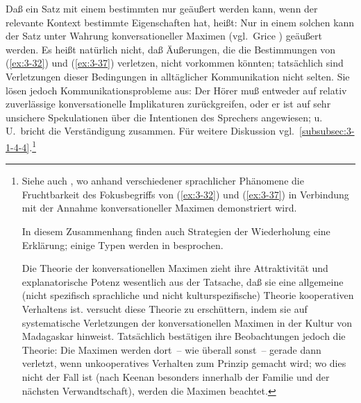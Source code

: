 \documentclass[output=paper]{langsci/langscibook}
\begin{document}
Daß ein Satz mit einem bestimmten  nur geäußert werden kann, wenn
der relevante Kontext bestimmte Eigenschaften hat, heißt: Nur in einem
solchen  kann der Satz unter Wahrung konversationeller
Maximen (vgl.\ \mbox{Grice} \citeyear{Grice75}) geäußert werden. Es heißt natürlich nicht, daß Äußerungen, die die Bestimmungen von (\ref{ex:3-32}) und (\ref{ex:3-37}) verletzen, nicht vorkommen könnten; tatsächlich sind Verletzungen dieser Bedingungen in alltäglicher Kommunikation nicht selten. Sie
lösen jedoch Kommunikationsprobleme aus: Der Hörer muß entweder auf relativ zuverlässige konversationelle Implikaturen zurückgreifen, oder er ist auf sehr unsichere Spekulationen über die Intentionen des Sprechers angewiesen; u.\,U.\ bricht die Verständigung zusammen. Für
weitere Diskussion vgl.\ \ref{subsubsec:3-1-4-4}.\footnote{\label{fn:3-12}%
	Siehe auch
  \citet{Clark77}, wo anhand verschiedener sprachlicher Phänomene die Fruchtbarkeit des
  Fokusbegriffs von (\ref{ex:3-32}) und (\ref{ex:3-37}) in Verbindung mit der Annahme
  konversationeller Maximen demonstriert wird.

  In diesem Zusammenhang finden auch Strategien der Wiederholung eine
  Erklärung; einige Typen werden in \citet{Lehman77} besprochen.

  Die Theorie der konversationellen Maximen zieht ihre Attraktivität und
  explanatorische Potenz wesentlich aus der Tatsache, daß sie eine
  allgemeine (nicht spezifisch sprachliche und nicht kulturspezifische)
  Theorie kooperativen Verhaltens ist. \citet{Keenan77} versucht
  diese Theorie zu erschüttern, indem sie auf systematische Verletzungen
  der konversationellen Maximen in der Kultur von Madagaskar
  hinweist. Tatsächlich bestätigen ihre Beobachtungen jedoch die
  Theorie: Die Maximen werden dort~-- wie überall sonst~-- gerade dann
  verletzt, wenn unkooperatives Verhalten zum Prinzip gemacht wird;
  wo dies nicht der Fall ist (nach Keenan besonders innerhalb der
  Familie und der nächsten Verwandtschaft), werden die Maximen beachtet.%
}
\end{document}
